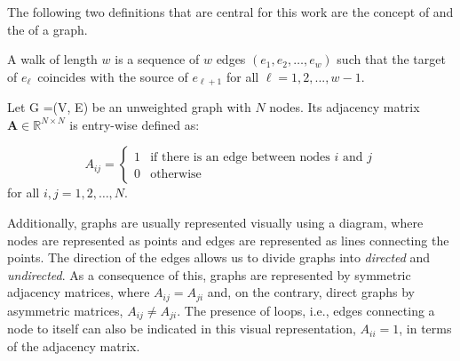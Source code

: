 
The following two definitions that are central for this work are the concept of  and the  of a graph.   

\begin{definition}
    A walk of length $w$ is a sequence of $w$ edges $(e_1, e_2, \dots, e_w)$ such that the target of $e_\ell$ coincides with the source of $e_{\ell+1}$ for all $\ell=1, 2, ..., w−1$.
\end{definition}
  
\begin{definition}
	Let G =(V, E) be an unweighted graph with $N$ nodes. Its adjacency matrix $\mathbf{A}\in\mathbb{R}^{N\times N}$ is entry-wise defined as:
 
 \begin{equation}
  A_{ij} =
    \begin{cases}
      1 & \text{if there is an edge between nodes $i$ and $j$}\\
      0 & \text{otherwise}
    \end{cases}       
\end{equation}
for all $i, j = 1,2,\dots, N$.
\end{definition}


Additionally, graphs are usually represented visually using a diagram, where nodes are represented as points and edges are represented as lines connecting the points. The direction of the edges allows us to divide graphs into \textit{directed} and \textit{undirected}. As a consequence of this,  graphs are represented by symmetric adjacency matrices, where $A_{ij}=A_{ji}$ and, on the contrary, direct graphs by asymmetric matrices, $A_{ij}\ne A_{ji}$. The presence of loops, i.e., edges connecting a node to itself can also be indicated in this visual representation, $A_{ii} = 1$, in terms of the adjacency matrix.


